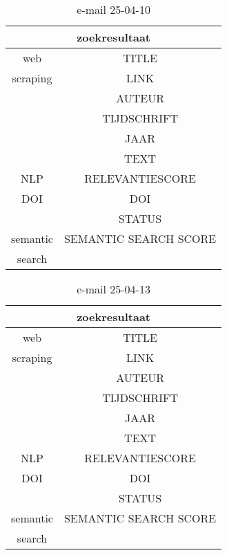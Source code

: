 \begin{table}[h!]
    \caption{e-mail 25-04-10}
    \centering
    \begin{tabular}{|c|c|} 
        \hline
        \multicolumn{2}{|c|}{\textbf{zoekresultaat}} \\
        \hline
        web &TITLE\\
        scraping&LINK\\
        &AUTEUR\\
        &TIJDSCHRIFT\\
        &JAAR\\
        &TEXT\\
        \hline
        NLP&RELEVANTIESCORE\\
        \hline
        DOI&DOI\\
        &STATUS\\
        \hline
        semantic&SEMANTIC SEARCH SCORE\\
        search&\\
        \hline
    \end{tabular}
    \label{table:email20250410}
\end{table}
\begin{table}[h!]
    \caption{e-mail 25-04-13}
    \centering
    \begin{tabular}{|c|c|} 
        \hline
        \multicolumn{2}{|c|}{\textbf{zoekresultaat}} \\
        \hline
        web &TITLE\\
        scraping&LINK\\
        &AUTEUR\\
        &TIJDSCHRIFT\\
        &JAAR\\
        &TEXT\\
        \hline
        NLP&RELEVANTIESCORE\\
        \hline
        DOI&DOI\\
        &STATUS\\
        \hline
        semantic&SEMANTIC SEARCH SCORE\\
        search&\\
        \hline
    \end{tabular}
    \label{table:email20250413}
\end{table}
